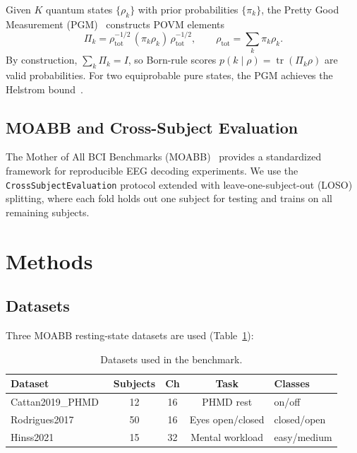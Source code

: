 \documentclass{article}
\newcommand{\tr}{\operatorname{tr}}
\begin{document}
Given $K$ quantum states $\{\rho_k\}$ with prior probabilities $\{\pi_k\}$,
the Pretty Good Measurement (PGM)~\cite{hausladen1994pretty} constructs
POVM elements
\begin{equation}
  \Pi_k = \rho_{\text{tot}}^{-1/2} \,(\pi_k \rho_k)\, \rho_{\text{tot}}^{-1/2},
  \qquad \rho_{\text{tot}} = \sum_k \pi_k \rho_k.
\end{equation}
By construction, $\sum_k \Pi_k = I$, so Born-rule scores
$p(k \mid \rho) = \tr(\Pi_k \rho)$ are valid probabilities.  For two
equiprobable pure states, the PGM achieves the Helstrom
bound~\cite{helstrom1976quantum}.

\subsection{MOABB and Cross-Subject Evaluation}

The Mother of All BCI Benchmarks (MOABB)~\cite{jayaram2018moabb} provides a
standardized framework for reproducible EEG decoding experiments.  We use the
\texttt{CrossSubjectEvaluation} protocol extended with leave-one-subject-out
(LOSO) splitting, where each fold holds out one subject for testing and
trains on all remaining subjects.


\section{Methods}
\label{sec:methods}

\subsection{Datasets}

Three MOABB resting-state datasets are used (Table~\ref{tab:datasets}):

\begin{table}[h]
  \caption{Datasets used in the benchmark.}
  \label{tab:datasets}
  \centering
  \begin{tabular}{lcccl}
    \toprule
    Dataset & Subjects & Ch & Task & Classes \\
    \midrule
    Cattan2019\_PHMD~\cite{Cattan2019} & 12 & 16 & PHMD rest & on/off \\
    Rodrigues2017~\cite{Rodrigues2017} & 50 & 16 & Eyes open/closed & closed/open \\
    Hinss2021~\cite{Hinss2021}         & 15 & 32 & Mental workload & easy/medium \\
    \bottomrule
  \end{tabular}
\end{table}
\end{document}
